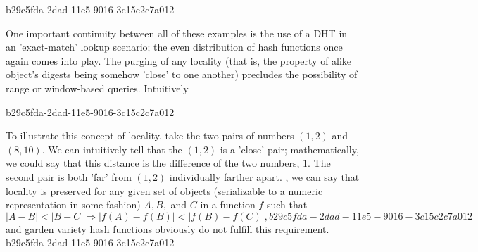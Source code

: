 \documentclass[12pt]{article}
\begin{document}
b29c5fda-2dad-11e5-9016-3c15c2c7a012\par One important continuity between all of these examples is the use of a DHT in an 'exact-match' lookup scenario; the even distribution of hash functions once again comes into play. The purging of any locality (that is, the property of alike object's digests being somehow 'close' to one another) precludes the possibility of range or window-based queries. Intuitively

b29c5fda-2dad-11e5-9016-3c15c2c7a012\par To illustrate this concept of locality, take the two pairs of numbers $(1,2)$ and $(8,10)$. We can intuitively tell that the $(1,2)$ is a 'close' pair; mathematically, we could say that this distance is the difference of the two numbers, $1$. The second pair is both 'far' from $(1,2)$ individually farther apart. , we can say that locality is preserved for any given set of objects (serializable to a numeric representation in some fashion) $A,B,$ and $C$ in a function $f$ such that
\begin{equation}
|A-B| < |B-C| \Rightarrow |f(A)-f(B)| < |f(B) - f(C)|,
b29c5fda-2dad-11e5-9016-3c15c2c7a012\end{equation}
and garden variety hash functions obviously do not fulfill this requirement.
b29c5fda-2dad-11e5-9016-3c15c2c7a012
\printbibliography
\end{document}
